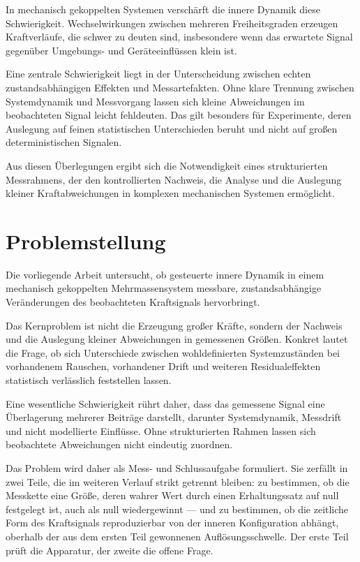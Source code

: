 \documentclass[12pt,a4paper]{report}
\begin{document}
In mechanisch gekoppelten Systemen verschärft die innere Dynamik diese
Schwierigkeit. Wechselwirkungen zwischen mehreren Freiheitsgraden
erzeugen Kraftverläufe, die schwer zu deuten sind, insbesondere wenn das
erwartete Signal gegenüber Umgebungs- und Geräteeinflüssen klein ist.

Eine zentrale Schwierigkeit liegt in der Unterscheidung zwischen echten
zustandsabhängigen Effekten und Messartefakten. Ohne klare Trennung
zwischen Systemdynamik und Messvorgang lassen sich kleine Abweichungen im
beobachteten Signal leicht fehldeuten. Das gilt besonders für
Experimente, deren Auslegung auf feinen statistischen Unterschieden
beruht und nicht auf großen deterministischen Signalen.

Aus diesen Überlegungen ergibt sich die Notwendigkeit eines
strukturierten Messrahmens, der den kontrollierten Nachweis, die Analyse
und die Auslegung kleiner Kraftabweichungen in komplexen mechanischen
Systemen ermöglicht.

\section{Problemstellung}

Die vorliegende Arbeit untersucht, ob gesteuerte innere Dynamik in einem
mechanisch gekoppelten Mehrmassensystem messbare, zustandsabhängige
Veränderungen des beobachteten Kraftsignals hervorbringt.

Das Kernproblem ist nicht die Erzeugung großer Kräfte, sondern der
Nachweis und die Auslegung kleiner Abweichungen in gemessenen Größen.
Konkret lautet die Frage, ob sich Unterschiede zwischen wohldefinierten
Systemzuständen bei vorhandenem Rauschen, vorhandener Drift und weiteren
Residualeffekten statistisch verlässlich feststellen lassen.

Eine wesentliche Schwierigkeit rührt daher, dass das gemessene Signal
eine Überlagerung mehrerer Beiträge darstellt, darunter Systemdynamik,
Messdrift und nicht modellierte Einflüsse. Ohne strukturierten Rahmen
lassen sich beobachtete Abweichungen nicht eindeutig zuordnen.

Das Problem wird daher als Mess- und Schlussaufgabe formuliert. Sie
zerfällt in zwei Teile, die im weiteren Verlauf strikt getrennt bleiben:
zu bestimmen, ob die Messkette eine Größe, deren wahrer Wert durch einen
Erhaltungssatz auf null festgelegt ist, auch als null wiedergewinnt --- und
zu bestimmen, ob die zeitliche Form des Kraftsignals reproduzierbar von
der inneren Konfiguration abhängt, oberhalb der aus dem ersten Teil
gewonnenen Auflösungsschwelle. Der erste Teil prüft die Apparatur, der
zweite die offene Frage.
\end{document}
